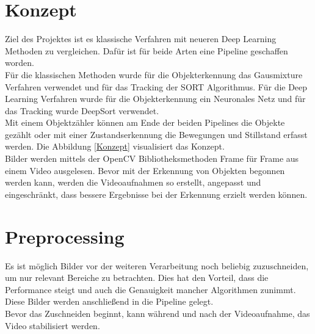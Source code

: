 \documentclass[conference]{IEEEtran}
\begin{document}
	\section{Konzept}
	Ziel des Projektes ist es klassische Verfahren mit neueren Deep Learning Methoden zu vergleichen.
	Dafür ist für beide Arten eine Pipeline geschaffen worden.\\
	Für die klassischen Methoden wurde für die Objekterkennung das Gausmixture Verfahren verwendet und für das Tracking der SORT Algorithmus. Für die Deep Learning Verfahren wurde für die Objekterkennung ein Neuronales Netz und für das Tracking wurde DeepSort verwendet.\\
	Mit einem Objektzähler können am Ende der beiden Pipelines die Objekte gezählt oder mit einer Zustandserkennung die Bewegungen und Stillstand erfasst werden. Die Abbildung \ref{Konzept} visualisiert das Konzept.\\
	Bilder werden mittels der OpenCV Bibliotheksmethoden Frame für Frame aus einem Video ausgelesen.
	Bevor mit der Erkennung von Objekten begonnen werden kann, werden die Videoaufnahmen so erstellt, angepasst und eingeschränkt, dass bessere Ergebnisse bei der Erkennung erzielt werden können.
	\section{Preprocessing}
	Es ist möglich Bilder vor der weiteren Verarbeitung noch beliebig zuzuschneiden, um nur relevant Bereiche zu betrachten. Dies hat den Vorteil, dass die Performance steigt und auch die Genauigkeit mancher Algorithmen zunimmt. Diese Bilder werden anschließend in die Pipeline gelegt.\\
	Bevor das Zuschneiden beginnt, kann während und nach der Videoaufnahme, das Video stabilisiert werden.
\end{document}
